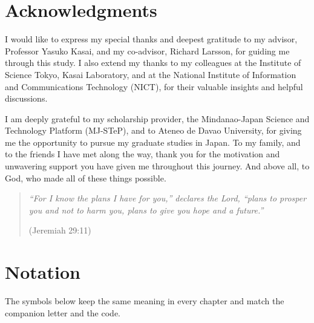 \documentclass[11pt,a4paper,oneside]{report}
\begin{document}
\chapter*{Acknowledgments}
I would like to express my special thanks and deepest gratitude to my
advisor, Professor Yasuko Kasai, and my co-advisor, Richard Larsson,
for guiding me through this study. I also extend my thanks to my
colleagues at the Institute of Science Tokyo, Kasai Laboratory, and at
the National Institute of Information and Communications Technology
(NICT), for their valuable insights and helpful discussions.

I am deeply grateful to my scholarship provider, the Mindanao-Japan
Science and Technology Platform (MJ-STeP), and to Ateneo de Davao
University, for giving me the opportunity to pursue my graduate studies
in Japan. To my family, and to the friends I have met along the way,
thank you for the motivation and unwavering support you have given me
throughout this journey. And above all, to God, who made all of these
things possible.

\begin{quote}
\itshape\noindent
``For I know the plans I have for you,'' declares the Lord, ``plans to
prosper you and not to harm you, plans to give you hope and a future.''

\upshape\normalfont\raggedleft (Jeremiah 29:11)
\end{quote}

\tableofcontents
\listoffigures
\listoftables

\chapter*{Notation}

\noindent The symbols below keep the same meaning in every chapter and
match the companion letter and the code.
\end{document}
